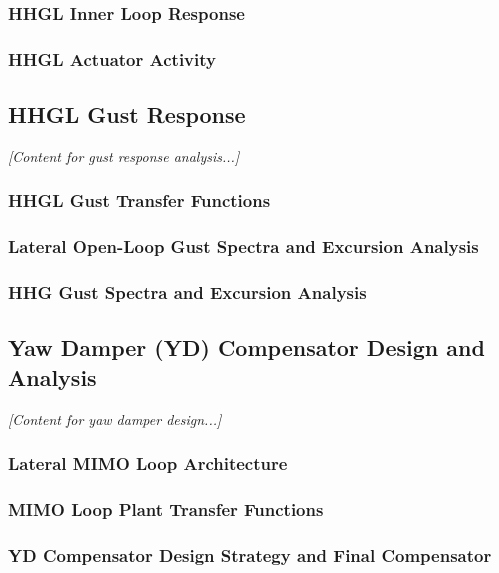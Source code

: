 \subsubsection{HHGL Inner Loop Response}

\subsubsection{HHGL Actuator Activity}

\subsection{HHGL Gust Response}

\textit{[Content for gust response analysis...]}

\subsubsection{HHGL Gust Transfer Functions}

\subsubsection{Lateral Open-Loop Gust Spectra and Excursion Analysis}

\subsubsection{HHG Gust Spectra and Excursion Analysis}

\subsection{Yaw Damper (YD) Compensator Design and Analysis}

\textit{[Content for yaw damper design...]}

\subsubsection{Lateral MIMO Loop Architecture}

\subsubsection{MIMO Loop Plant Transfer Functions}

\subsubsection{YD Compensator Design Strategy and Final Compensator}

